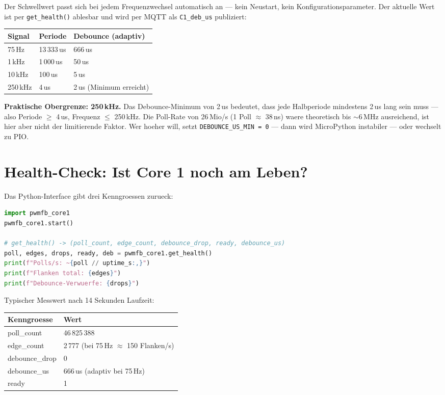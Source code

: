 \documentclass[11pt,a4paper]{article}
\begin{document}
Der Schwellwert passt sich bei jedem Frequenzwechsel automatisch an ---
kein Neustart, kein Konfigurationsparameter.
Der aktuelle Wert ist per \texttt{get\_health()} ablesbar und wird
per MQTT als \texttt{C1\_deb\_us} publiziert:

\begin{center}
\begin{tabular}{lll}
\toprule
\textbf{Signal} & \textbf{Periode} & \textbf{Debounce (adaptiv)} \\
\midrule
75\,Hz    & 13\,333\,us & 666\,us \\
1\,kHz    & 1\,000\,us  & 50\,us \\
10\,kHz   & 100\,us     & 5\,us \\
250\,kHz  & 4\,us       & 2\,us (Minimum erreicht) \\
\bottomrule
\end{tabular}
\end{center}

\textbf{Praktische Obergrenze: 250\,kHz.}
Das Debounce-Minimum von 2\,us bedeutet, dass jede Halbperiode
mindestens 2\,us lang sein muss --- also Periode $\geq$ 4\,us,
Frequenz $\leq$ 250\,kHz.
Die Poll-Rate von 26\,Mio/s (1 Poll $\approx$ 38\,ns) waere theoretisch
bis $\sim$6\,MHz ausreichend, ist hier aber nicht der limitierende Faktor.
Wer hoeher will, setzt \texttt{DEBOUNCE\_US\_MIN = 0} ---
dann wird MicroPython instabiler --- oder wechselt zu PIO.

\section{Health-Check: Ist Core 1 noch am Leben?}

Das Python-Interface gibt drei Kenngroessen zurueck:

\begin{lstlisting}[language=Python, caption={Health-Check aus MicroPython}]
import pwmfb_core1
pwmfb_core1.start()

# get_health() -> (poll_count, edge_count, debounce_drop, ready, debounce_us)
poll, edges, drops, ready, deb = pwmfb_core1.get_health()
print(f"Polls/s: ~{poll // uptime_s:,}")
print(f"Flanken total: {edges}")
print(f"Debounce-Verwuerfe: {drops}")
\end{lstlisting}

Typischer Messwert nach 14 Sekunden Laufzeit:

\begin{center}
\begin{tabular}{ll}
\toprule
\textbf{Kenngroesse} & \textbf{Wert} \\
\midrule
poll\_count  & 46\,825\,388 \\
edge\_count  & 2\,777 (bei 75\,Hz $\approx$ 150 Flanken/s) \\
debounce\_drop & 0 \\
debounce\_us  & 666\,us (adaptiv bei 75\,Hz) \\
ready        & 1 \\
\bottomrule
\end{tabular}
\end{center}
\end{document}

